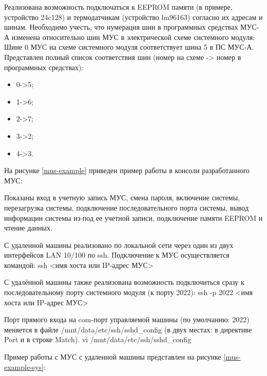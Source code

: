Реализована возможность подключаться к EEPROM памяти (в примере, устройство 24c128) и термодатчикам (устройство lm96163) согласно их адресам и шинам. Необходимо учесть, что нумерация шин в программных средствах МУС-А изменена относительно шин МУС в электрической схеме системного модуля:
Шине 0 МУС на схеме системного модуля соответствует шина 5 в ПС МУС-А.
Представлен полный список соответствия шин (номер на схеме -> номер в программных средствах):
\begin{itemize}
	\item 0->5;
	\item 1->6;
	\item 2->7;
	\item 3->2;
	\item 4->3.
\end{itemize}

На рисунке \ref{mus-example} приведен пример работы в консоли разработанного МУС:

Показаны вход в учетную запись МУС, смена пароля, включение системы, перезагрузка системы, подключение последовательного порта системы, вывод информации системы из-под ее учетной записи, подключение памяти EEPROM и чтение данных.

С удаленной машины реализовано по локальной сети через один из двух интерфейсов LAN 10/100 по ssh. Подключение к МУС осуществляется командой:
\newline ssh <имя хоста или IP-адрес МУС>

С удалённой машины также реализована возможность подключиться сразу к последовательному порту системного модуля (к порту 2022):
ssh -p 2022 <имя хоста или IP-адрес МУС>

Порт прямого входа на com-порт управляемой машины (по умолчанию: 2022) меняется в файле /mnt/data/etc/ssh/sshd\_config (в двух местах: в директиве Port и в строке Match).
vi /mnt/data/etc/ssh/sshd\_config

Пример работы с МУС с удаленной машины представлен на рисунке \ref{mus-example-sys}:

\clearpage

